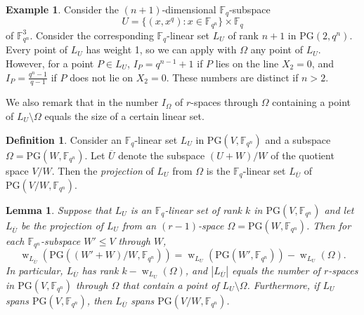 \documentclass[11pt]{article}
\newtheorem{lemma}[theorem]{Lemma}
\theoremstyle{definition}
\newtheorem{definition}[theorem]{Definition}
\newtheorem{example}[theorem]{Example}
\newcommand{\fqn}{\mathbb{F}_{q^n}}
\newcommand{\fq}{{\mathbb F}_{q}}
\newcommand{\PG}{\mathrm{PG}}
\newcommand{\pg}{\PG}
\DeclareMathOperator{\ww}{w}
\begin{document}
\begin{example}
Consider the $(n+1)$-dimensional $\fq$-subspace
\[
 U = \{ (x,x^q) : x \in \fqn\} \times \fq
\]
of $\fqn^3$.
Consider the corresponding $\fq$-linear set $L_U$ of rank $n+1$ in $\PG(2,q^n)$.
Every point of $L_U$ has weight 1, so we can apply  with $\Omega$ any point of $L_U$.
However, for a point $P \in L_U$, $I_P = q^{n-1} + 1$ if $P$ lies on the line $X_2=0$, and $I_P = \frac{q^n-1}{q-1}$ if $P$ does not lie on $X_2=0$.
These numbers are distinct if $n>2$.
\end{example}

We also remark that in  the number $I_\Omega$ of $r$-spaces through $\Omega$ containing a point of $L_U \setminus \Omega$ equals the size of a certain linear set.

\begin{definition}
 Consider an $\fq$-linear set $L_U$ in $\pg(V,\fqn)$ and a subspace $\Omega = \pg(W,\fqn)$.
 Let $\overline U$ denote the subspace $(U+W)/W$ of the quotient space $V/W$.
 Then the \emph{projection} of $L_U$ from $\Omega$ is the $\fq$-linear set $L_{\overline U}$ of $\pg(V/W,\fqn)$.
\end{definition}

\begin{lemma} \label{lem:projectionlinear}
 Suppose that $L_U$ is an $\fq$-linear set of rank $k$ in $\pg(V,\fqn)$ and let $L_{\overline U}$ be the projection of $L_U$ from an $(r-1)$-space $\Omega = \pg(W,\fqn)$.
 Then for each $\fqn$-subspace $W' \leq V$ through $W$,
 \[
  \ww_{L_{\overline U}}(\pg((W' + W)/W,\fqn)) = \ww_{L_U}(\pg(W',\fqn)) - \ww_{L_U}(\Omega).
 \]
 In particular, $L_{\overline U}$ has rank $k - \ww_{L_U}(\Omega)$, and $|L_{\overline U}|$ equals the number of $r$-spaces in $\pg(V,\fqn)$ through $\Omega$ that contain a point of $L_U \setminus \Omega$. Furthermore, if $L_U$ spans $\pg(V,\fqn)$, then $L_{\overline{U}}$ spans $\pg(V/W,\fqn)$.
\end{lemma}
\end{document}

